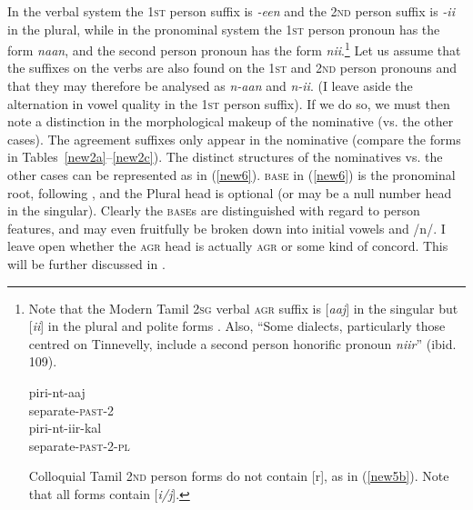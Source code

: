 \documentclass[output=paper]{langscibook}
\begin{document}
In the verbal system the 1\textsc{st} person suffix is \textit{-een} and the 2\textsc{nd} person suffix is \textit{-ii} in the plural, while in the pronominal system the 1\textsc{st} person pronoun has the form \textit{naan}, and the second person pronoun has the form \textit{nii}.\footnote{Note that the Modern Tamil 2\textsc{sg} verbal \textsc{agr} suffix is [\textit{aaj}] in the singular but [\textit{ii}] in the plural and polite forms \citep[113]{steever2019dravidian}. Also, “Some dialects, particularly those centred on Tinnevelly, include a second person honorific pronoun \textit{niir}” (ibid. 109).


\begin{exe}
\ex \label{newfootnote1a}
\gll piri-nt-aaj \\
separate-\textsc{past}-2 \\

\ex \label{newfootnote1b}
\gll piri-nt-iir-kal \\ 
separate-\textsc{past}-2-\textsc{pl} \\
\end{exe}


Colloquial Tamil 2\textsc{nd} person forms do not contain [r], as in (\ref{new5b}). Note that all forms contain [\textit{i/j}].
}   Let us assume that the suffixes on the verbs are also found on the 1\textsc{st} and 2\textsc{nd} person pronouns and that they may therefore be analysed as          \textit{n-aan} and \textit{n-ii}. (I leave aside the alternation in vowel quality in the 1\textsc{st} person suffix). If we do so, we must then note a distinction in the morphological makeup of the nominative (vs. the other cases). The agreement suffixes only appear in the nominative (compare the forms in Tables~\ref{new2a}--\ref{new2c}). 
The distinct structures of the nominatives vs. the other cases can be represented as in (\ref{new6}).
\textsc{base} in (\ref{new6}) is the pronominal root, following \citet{SmithBobaljik2019}, and the Plural head is optional (or may be a null number head in the singular). Clearly the \textsc{base}s are distinguished with regard to person features, and may even fruitfully be broken down into initial vowels and /n/. I leave open whether the \textsc{agr} head is actually \textsc{agr} or some kind of concord. This will be further discussed in .\largerpage[-1]
\end{document}
